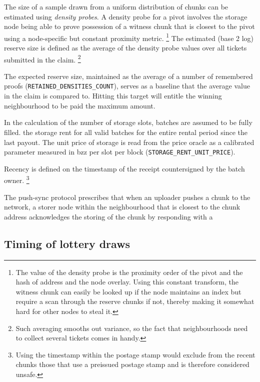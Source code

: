The size of a sample drawn from a uniform distribution of chunks can be estimated using \emph{density probes}. A density probe for a pivot involves the storage node being able to prove possession of a witness chunk that is closest to the pivot using a node-specific but constant proximity metric.%
%
\footnote{The value of the density probe is the proximity order of the pivot and the hash of address and the node overlay. Using this constant transform, the witness chunk can easily be looked up if the node maintains an index but require a scan through the reserve chunks if not, thereby making it somewhat hard for other nodes to steal it.}
%
The estimated (base 2 log) reserve size is defined as the average of the density probe values over all tickets submitted in the claim.%
%
\footnote{Such averaging smooths out variance, so the fact that neighbourhoods need to collect several tickets comes in handy.}

The expected reserve size, maintained as the average of a number of remembered proofs (\texttt{RETAINED\_DENSITIES\_COUNT}), serves as a baseline that the average value in the claim is compared to. Hitting this target will entitle the winning neighbourhood to be paid the maximum amount. 

In the calculation of the number of storage slots, batches are assumed to be fully filled. 
the storage rent for all valid batches  for the entire rental period since the last payout. The unit price of storage is read from the price oracle as a calibrated parameter measured in bzz per slot per block (\texttt{STORAGE\_RENT\_UNIT\_PRICE}). 






Recency is defined on the timestamp of the receipt countersigned by the batch owner.%
%
\footnote{Using the timestamp within the postage stamp would exclude from the recent chunks those that use a preissued postage stamp and is therefore considered unsafe.}

The push-sync protocol prescribes that when an uploader pushes a chunk to the network, a storer node within the neighbourhood that is closest to the chunk address acknowledges the storing of the chunk by responding with a

\subsection{Timing of lottery draws}
 
